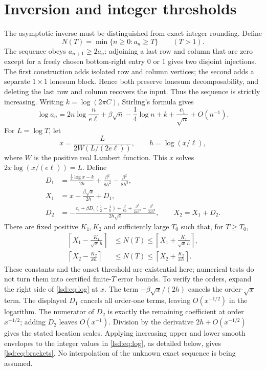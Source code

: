 \documentclass[11pt]{article}
\theoremstyle{remark}\newtheorem{remark}{Remark}
\begin{document}
\section{Inversion and integer thresholds}
The asymptotic inverse must be distinguished from exact integer rounding. Define
\[
 N(T)=\min\{n\geq0:a_n\geq T\}\qquad(T>1).
\]
The sequence obeys $a_{n+1}\geq2a_n$: adjoining a last row and column that are zero except for a freely chosen bottom-right entry $0$ or $1$ gives two disjoint injections. The first construction adds isolated row and column vertices; the second adds a separate $1\times1$ lonesum block. Hence both preserve lonesum decomposability, and deleting the last row and column recovers the input. Thus the sequence is strictly increasing.
Writing $k=\log(2\pi C)$, Stirling's formula gives
\begin{equation}\label{lsd:eq:log}
 \log a_n=2n\log\frac{n}{e\ell}+\beta\sqrt n-\frac14\log n+k+\frac{c_1}{\sqrt n}+O(n^{-1}).
\end{equation}
For $L=\log T$, let
\[
 x=\frac{L}{2W(L/(2e\ell))},\qquad h=\log(x/\ell),
\]
where $W$ is the positive real Lambert function. This $x$ solves $2x\log(x/(e\ell))=L$. Define
\begin{align*}
 D_1&=\frac{\frac14\log x-k}{2h}+\frac{\beta^2}{8h^2}-\frac{\beta^2}{8h^3},\\
 X_1&=x-\frac{\beta\sqrt x}{2h}+D_1,\\
 D_2&=-\frac{c_1+\beta D_1(\frac12-\frac1h)+\frac{\beta}{8h}
                  +\frac{\beta^3}{24h^3}-\frac{\beta^3}{32h^2}}
                 {2h\sqrt x},\qquad X_2=X_1+D_2.
\end{align*}
There are fixed positive $K_1,K_2$ and sufficiently large $T_0$ such that, for $T\geq T_0$,
\begin{align}\label{lsd:eq:brackets}
 \left\lceil X_1-\frac{K_1}{\sqrt x\,h}\right\rceil
 &\leq N(T)\leq
 \left\lceil X_1+\frac{K_1}{\sqrt x\,h}\right\rceil,\\
 \left\lceil X_2-\frac{K_2}{x h}\right\rceil
 &\leq N(T)\leq
 \left\lceil X_2+\frac{K_2}{x h}\right\rceil.\nonumber
\end{align}
These constants and the onset threshold are existential here; numerical tests do not turn them into certified finite-$T$ error bounds.
To verify the orders, expand the right side of \eqref{lsd:eq:log} at $x$.
The term $-\beta\sqrt x/(2h)$ cancels the order-$\sqrt x$ term. The displayed $D_1$ cancels all order-one terms, leaving $O(x^{-1/2})$ in the logarithm. The numerator of $D_2$ is exactly the remaining coefficient at order $x^{-1/2}$; adding $D_2$ leaves $O(x^{-1})$. Division by the derivative $2h+O(x^{-1/2})$ gives the stated location scales. Applying increasing upper and lower smooth envelopes to the integer values in \eqref{lsd:eq:log}, as detailed below, gives \eqref{lsd:eq:brackets}. No interpolation of the unknown exact sequence is being assumed.
\end{document}
